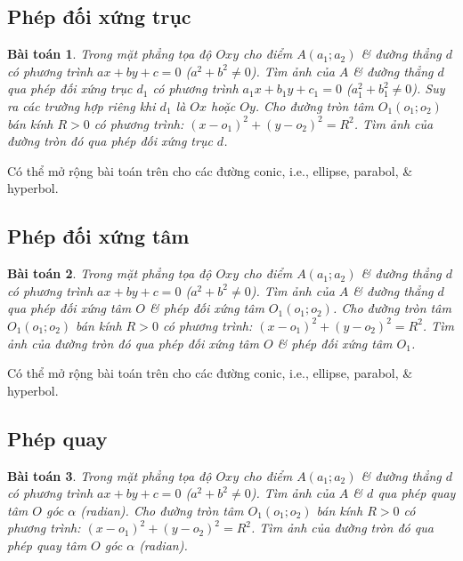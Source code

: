 \documentclass{article}
\numberwithin{equation}{section}
\newtheorem{baitoan}{Bài toán}[section]
\begin{document}

\subsection{Phép đối xứng trục}

\begin{baitoan}
	Trong mặt phẳng tọa độ $Oxy$ cho điểm $A(a_1;a_2)$ \& đường thẳng $d$ có phương trình $ax + by + c = 0$ ($a^2 + b^2\ne 0$). Tìm ảnh của $A$ \& đường thẳng $d$ qua phép đối xứng trục $d_1$ có phương trình $a_1x + b_1y + c_1 = 0$ ($a_1^2 + b_1^2\ne 0$). Suy ra các trường hợp riêng khi $d_1$ là $Ox$ hoặc $Oy$. Cho đường tròn tâm $O_1(o_1;o_2)$ bán kính $R > 0$ có phương trình: $(x - o_1)^2 + (y - o_2)^2 = R^2$. Tìm ảnh của đường tròn đó qua phép đối xứng trục $d$.
\end{baitoan}
Có thể mở rộng bài toán trên cho các đường conic, i.e., ellipse, parabol, \& hyperbol.


\subsection{Phép đối xứng tâm}

\begin{baitoan}
	Trong mặt phẳng tọa độ $Oxy$ cho điểm $A(a_1;a_2)$ \& đường thẳng $d$ có phương trình $ax + by + c = 0$ ($a^2 + b^2\ne 0$). Tìm ảnh của $A$ \& đường thẳng $d$ qua phép đối xứng tâm $O$ \& phép đối xứng tâm $O_1(o_1;o_2)$. Cho đường tròn tâm $O_1(o_1;o_2)$ bán kính $R > 0$ có phương trình: $(x - o_1)^2 + (y - o_2)^2 = R^2$. Tìm ảnh của đường tròn đó qua phép đối xứng tâm $O$ \& phép đối xứng tâm $O_1$.
\end{baitoan}
Có thể mở rộng bài toán trên cho các đường conic, i.e., ellipse, parabol, \& hyperbol.


\subsection{Phép quay}

\begin{baitoan}
	Trong mặt phẳng tọa độ $Oxy$ cho điểm $A(a_1;a_2)$ \& đường thẳng $d$ có phương trình $ax + by + c = 0$ ($a^2 + b^2\ne 0$). Tìm ảnh của $A$ \& $d$ qua phép quay tâm $O$ góc $\alpha$ (radian). Cho đường tròn tâm $O_1(o_1;o_2)$ bán kính $R > 0$ có phương trình: $(x - o_1)^2 + (y - o_2)^2 = R^2$. Tìm ảnh của đường tròn đó qua phép quay tâm $O$ góc $\alpha$ (radian).
\end{baitoan}
\end{document}
